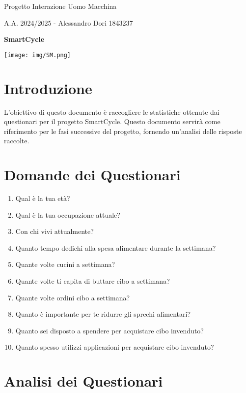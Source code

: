 \documentclass{article}
\begin{document}
\begin{center}
    \Huge Progetto Interazione Uomo Macchina
        \vspace{0.5cm}

        \large A.A. 2024/2025 - Alessandro Dori 1843237
        \vspace{1cm}

        \large \textsf{\textbf{SmartCycle}}

        \texttt{[image: img/SM.png]}
\end{center}

\tableofcontents
\newpage

\section{Introduzione}
L'obiettivo di questo documento è raccogliere le statistiche ottenute dai questionari per il progetto SmartCycle.
Questo documento servirà come riferimento per le fasi successive del progetto, fornendo un'analisi delle risposte raccolte.

\section{Domande dei Questionari}
\begin{enumerate}
    \item Qual è la tua età?
    \item Qual è la tua occupazione attuale?
    \item Con chi vivi attualmente?
    \item Quanto tempo dedichi alla spesa alimentare durante la settimana?
    \item Quante volte cucini a settimana?
    \item Quante volte ti capita di buttare cibo a settimana?
    \item Quante volte ordini cibo a settimana?
    \item Quanto è importante per te ridurre gli sprechi alimentari?
    \item Quanto sei disposto a spendere per acquistare cibo invenduto?
    \item Quanto spesso utilizzi applicazioni per acquistare cibo invenduto?
\end{enumerate}

\newpage
\section{Analisi dei Questionari}
\end{document}
